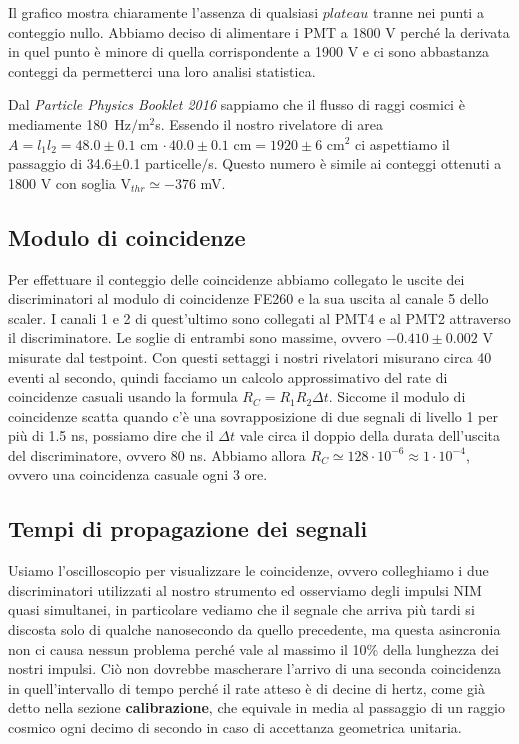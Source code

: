 \documentclass[a4paper]{article}
\begin{document}
Il grafico mostra chiaramente l'assenza di qualsiasi $plateau$ tranne nei punti a conteggio nullo. Abbiamo deciso di alimentare i PMT a 1800\! V perché la derivata in quel punto è minore di quella corrispondente a 1900\! V e ci sono abbastanza conteggi da permetterci una loro analisi statistica.

Dal \emph{Particle Physics Booklet 2016} sappiamo che il flusso di raggi cosmici è mediamente 180~Hz$/$\!m$^2$s. Essendo il nostro rivelatore di area $A=l_1l_2=48.0\pm0.1$\! cm $\cdot \, 40.0\pm0.1$\! cm$=1920\pm6$\! cm$^2$ ci aspettiamo il passaggio di 34.6$\pm$0.1 particelle$/$s. Questo numero è simile ai conteggi ottenuti a 1800\! V con soglia V$_{thr}\simeq-376$\! mV. 

\subsection*{Modulo di coincidenze}

Per effettuare il conteggio delle coincidenze abbiamo collegato le uscite dei discriminatori al modulo di coincidenze FE260 e la sua uscita al canale 5 dello scaler. I canali 1 e 2 di quest'ultimo sono collegati al PMT4 e al PMT2 attraverso il discriminatore. Le soglie di entrambi sono massime, ovvero $-0.410\pm0.002$\! V misurate dal testpoint. Con questi settaggi i nostri rivelatori misurano circa 40 eventi al secondo, quindi facciamo un calcolo approssimativo del rate di coincidenze casuali usando la formula $R_C=R_1R_2\Delta t$. Siccome il modulo di coincidenze scatta quando c'è una sovrapposizione  di due segnali di livello 1 per più di 1.5\! ns, possiamo dire che il $\Delta t$ vale circa il doppio della durata dell'uscita del discriminatore, ovvero 80\! ns. Abbiamo allora $R_C\simeq 128\cdot10^{-6}\approx1\cdot10^{-4}$, ovvero una coincidenza casuale ogni 3 ore.

\subsection*{Tempi di propagazione dei segnali}

Usiamo l'oscilloscopio per visualizzare le coincidenze, ovvero colleghiamo i due discriminatori utilizzati al nostro strumento ed osserviamo degli impulsi NIM quasi simultanei, in particolare vediamo che il segnale che arriva più tardi si discosta solo di qualche nanosecondo da quello precedente, ma questa asincronia non ci causa nessun problema perché vale al massimo il 10\% della lunghezza dei nostri impulsi.
Ciò non dovrebbe mascherare l'arrivo di una seconda coincidenza in quell'intervallo di tempo perché il rate atteso è di decine di hertz, come già detto nella sezione \textbf{calibrazione}, che equivale in media al passaggio di un raggio cosmico ogni decimo di secondo in caso di accettanza geometrica unitaria.
\end{document}
